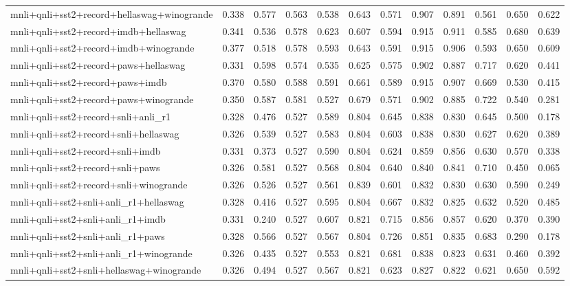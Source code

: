 \begin{table}[t]
\begin{tabular}{lrrrrrrrrrrr}
    mnli+qnli+sst2+record+hellaswag+winogrande & 0.338 & 0.577 & 0.563 & 0.538 & 0.643 & 0.571 & 0.907 & 0.891 & 0.561 & 0.650 & 0.622 \\
    mnli+qnli+sst2+record+imdb+hellaswag & 0.341 & 0.536 & 0.578 & 0.623 & 0.607 & 0.594 & 0.915 & 0.911 & 0.585 & 0.680 & 0.639 \\
    mnli+qnli+sst2+record+imdb+winogrande & 0.377 & 0.518 & 0.578 & 0.593 & 0.643 & 0.591 & 0.915 & 0.906 & 0.593 & 0.650 & 0.609 \\
    mnli+qnli+sst2+record+paws+hellaswag & 0.331 & 0.598 & 0.574 & 0.535 & 0.625 & 0.575 & 0.902 & 0.887 & 0.717 & 0.620 & 0.441 \\
    mnli+qnli+sst2+record+paws+imdb & 0.370 & 0.580 & 0.588 & 0.591 & 0.661 & 0.589 & 0.915 & 0.907 & 0.669 & 0.530 & 0.415 \\
    mnli+qnli+sst2+record+paws+winogrande & 0.350 & 0.587 & 0.581 & 0.527 & 0.679 & 0.571 & 0.902 & 0.885 & 0.722 & 0.540 & 0.281 \\
    mnli+qnli+sst2+record+snli+anli\_r1 & 0.328 & 0.476 & 0.527 & 0.589 & 0.804 & 0.645 & 0.838 & 0.830 & 0.645 & 0.500 & 0.178 \\
    mnli+qnli+sst2+record+snli+hellaswag & 0.326 & 0.539 & 0.527 & 0.583 & 0.804 & 0.603 & 0.838 & 0.830 & 0.627 & 0.620 & 0.389 \\
    mnli+qnli+sst2+record+snli+imdb & 0.331 & 0.373 & 0.527 & 0.590 & 0.804 & 0.624 & 0.859 & 0.856 & 0.630 & 0.570 & 0.338 \\
    mnli+qnli+sst2+record+snli+paws & 0.326 & 0.581 & 0.527 & 0.568 & 0.804 & 0.640 & 0.840 & 0.841 & 0.710 & 0.450 & 0.065 \\
    mnli+qnli+sst2+record+snli+winogrande & 0.326 & 0.526 & 0.527 & 0.561 & 0.839 & 0.601 & 0.832 & 0.830 & 0.630 & 0.590 & 0.249 \\
    mnli+qnli+sst2+snli+anli\_r1+hellaswag & 0.328 & 0.416 & 0.527 & 0.595 & 0.804 & 0.667 & 0.832 & 0.825 & 0.632 & 0.520 & 0.485 \\
    mnli+qnli+sst2+snli+anli\_r1+imdb & 0.331 & 0.240 & 0.527 & 0.607 & 0.821 & 0.715 & 0.856 & 0.857 & 0.620 & 0.370 & 0.390 \\
    mnli+qnli+sst2+snli+anli\_r1+paws & 0.328 & 0.566 & 0.527 & 0.567 & 0.804 & 0.726 & 0.851 & 0.835 & 0.683 & 0.290 & 0.178 \\
    mnli+qnli+sst2+snli+anli\_r1+winogrande & 0.326 & 0.435 & 0.527 & 0.553 & 0.821 & 0.681 & 0.838 & 0.823 & 0.631 & 0.460 & 0.392 \\
    mnli+qnli+sst2+snli+hellaswag+winogrande & 0.326 & 0.494 & 0.527 & 0.567 & 0.821 & 0.623 & 0.827 & 0.822 & 0.621 & 0.650 & 0.592 \\

\end{tabular}
\end{table}
